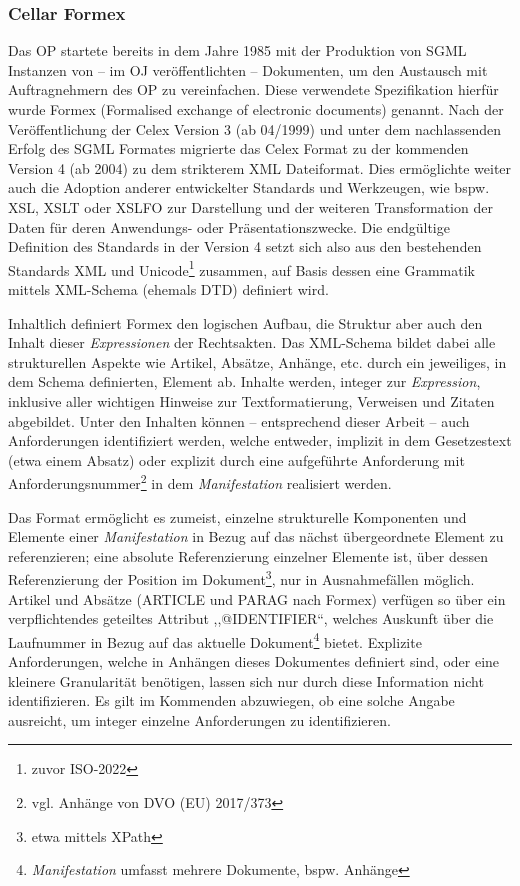 \subsubsection{Cellar Formex}

    Das \acf{OP} startete bereits in dem Jahre 1985 mit der Produktion von \ac{SGML} Instanzen von -- im \ac{OJ} veröffentlichten -- Dokumenten, um den Austausch mit Auftragnehmern des \ac{OP} zu vereinfachen. \cite[75]{eu_cellar, eu_fmx4_intro}
    Diese verwendete Spezifikation hierfür wurde Formex (Formalised exchange of electronic documents) genannt.
    Nach der Veröffentlichung der Celex Version 3 (ab 04/1999) und unter dem nachlassenden Erfolg des \ac{SGML} Formates migrierte das Celex Format zu der kommenden Version 4 (ab 2004) zu dem strikterem \ac{XML} Dateiformat.
    Dies ermöglichte weiter auch die Adoption anderer entwickelter Standards und Werkzeugen, wie bspw. \ac{XSL}, \ac{XSLT} oder \ac{XSLFO} zur Darstellung und der weiteren Transformation der Daten für deren Anwendungs- oder Präsentationszwecke.
    Die endgültige Definition des Standards in der Version 4 setzt sich also aus den bestehenden Standards \ac{XML} und Unicode\footnote{zuvor ISO-2022} zusammen, auf Basis dessen eine Grammatik mittels \ac{XML}-Schema (ehemals \ac{DTD}) definiert wird. \cite{eu_fmx4_intro}
    
    \medskip
    Inhaltlich definiert Formex den logischen Aufbau, die Struktur aber auch den Inhalt  dieser \textit{Expressionen} der Rechtsakten.
    Das \ac{XML}-Schema bildet dabei alle strukturellen Aspekte wie Artikel, Absätze, Anhänge, etc. durch ein jeweiliges, in dem Schema definierten, Element ab. 
    Inhalte werden, integer zur \textit{Expression}, inklusive aller wichtigen Hinweise zur Textformatierung, Verweisen und Zitaten abgebildet. 
    Unter den Inhalten können -- entsprechend dieser Arbeit -- auch Anforderungen identifiziert werden, welche entweder, implizit in dem Gesetzestext (etwa einem Absatz) oder explizit durch eine aufgeführte Anforderung mit Anforderungsnummer\footnote{vgl. Anhänge von \acs{DVO} (\acs{EU}) 2017/373} in dem \textit{Manifestation} realisiert werden.

    \medskip
    Das Format ermöglicht es zumeist, einzelne strukturelle Komponenten und Elemente einer \textit{Manifestation} in Bezug auf das nächst übergeordnete Element zu referenzieren; eine absolute Referenzierung einzelner Elemente ist, über dessen Referenzierung der Position im Dokument\footnote{etwa mittels XPath}, nur in Ausnahmefällen möglich.
    Artikel und Absätze (\textsf{ARTICLE} und \textsf{PARAG} nach Formex) verfügen so über ein verpflichtendes geteiltes Attribut ,,\textsf{@IDENTIFIER}``, welches Auskunft über die Laufnummer in Bezug auf das aktuelle Dokument\footnote{\textit{Manifestation} umfasst mehrere Dokumente, bspw. Anhänge} bietet. 
    Explizite Anforderungen, welche in Anhängen dieses Dokumentes definiert sind, oder eine kleinere Granularität benötigen, lassen sich nur durch diese Information nicht identifizieren.
    Es gilt im Kommenden abzuwiegen, ob eine solche Angabe ausreicht, um integer einzelne Anforderungen zu identifizieren. 

